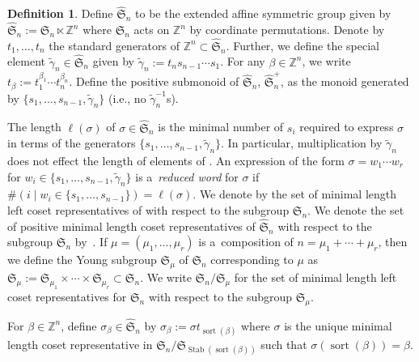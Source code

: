 \documentclass[pdftex]{sigma}
\numberwithin{equation}{section}
\theoremstyle{definition}
\newtheorem{Definition}[Theorem]{Definition}
\DeclareMathOperator{\sort}{sort}
\DeclareMathOperator{\Stab}{Stab}
\begin{document}
\begin{Definition}
 Define $\widehat{\mathfrak{S}}_n$ to be the extended affine symmetric group given by
$
 \widehat{\mathfrak{S}}_n:= \mathfrak{S}_n \ltimes \mathbb{Z}^{n}
$
 where $\mathfrak{S}_n$ acts on $\mathbb{Z}^{n}$ by coordinate permutations. Denote by $t_1,\dots, t_n$ the standard generators of $\mathbb{Z}^{n} \subset \widehat{\mathfrak{S}}_n$. Further, we define the special element $\widetilde{\gamma}_n \in \widehat{\mathfrak{S}}_n$ given by
$
 \widetilde{\gamma}_n:= t_ns_{n-1}\cdots s_1$.
 For any $\beta \in \mathbb{Z}^{n}$, we write
$
 t_{\beta}:= t_1^{\beta_1}\cdots t_n^{\beta_n}$.
 Define the positive submonoid of $\widehat{\mathfrak{S}}_n$, $\widehat{\mathfrak{S}}_n^{+}$, as the monoid generated by $\big\{s_1,\dots, s_{n-1},\widetilde{\gamma}_n \big\}$ (i.e., no $\widetilde{\gamma}_n^{-1}$s).

The length $\ell(\sigma)$ of $\sigma \in \widehat{\mathfrak{S}}_n$ is the minimal number of $s_i$ required to express $\sigma$ in terms of the generators $\big\{s_1,\dots,s_{n-1},\widetilde{\gamma}_n\big\}$.
In particular, multiplication by $\widetilde{\gamma}_n$ does not effect the length of elements of . An expression of the form $\sigma = w_1\cdots w_{r}$ for $w_i \in \{s_1,\dots,s_{n-1},\widetilde{\gamma}_n \}$ is a~\textit{reduced word} for $\sigma$ if $\#( i \mid w_i \in \{s_1,\dots,s_{n-1}\}) = \ell(\sigma)$.
 We denote by  the set of minimal length left coset representatives of  with respect to the subgroup $\mathfrak{S}_n$.
 We denote the set of positive minimal length coset representatives of $\widehat{\mathfrak{S}}_n$ with respect to the subgroup $\mathfrak{S}_n$ by~.
If $\mu = (\mu_1,\dots, \mu_r)$ is a~composition of $n = \mu_1+\cdots + \mu_r$, then we define the Young subgroup $\mathfrak{S}_{\mu}$ of $\mathfrak{S}_n$ corresponding to $\mu$ as $\mathfrak{S}_{\mu}:= \mathfrak{S}_{\mu_1}\times \cdots \times \mathfrak{S}_{\mu_r} \subset \mathfrak{S}_n$. We write $\mathfrak{S}_n/\mathfrak{S}_{\mu}$ for the set of minimal length left coset representatives for $\mathfrak{S}_n$ with respect to the subgroup $\mathfrak{S}_{\mu}$.

 For $\beta \in \mathbb{Z}^n$, define $\sigma_{\beta} \in \widehat{\mathfrak{S}}_n$ by
$
 \sigma_{\beta}:= \sigma t_{\sort(\beta)}
$
 where $\sigma$ is the unique minimal length coset representative in $\mathfrak{S}_n/\mathfrak{S}_{\Stab(\sort(\beta))}$ such that $\sigma(\sort(\beta))= \beta$.

\end{Definition}
\end{document}
